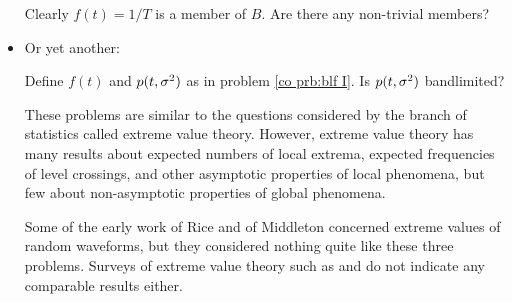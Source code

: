 \begin{itemize}
\begin{problem}
Clearly $f(t)=1/T$ is a member of $B$.  Are there any non-trivial
members?
\end{problem}

\item Or yet another:

\begin{problem}
\label{co prb:blf III}\mbox{}\par

Define $f(t)$ and $p(t,{\sigma^2})$ as in problem \ref{co prb:blf I}.  Is
$p(t,{\sigma^2})$ bandlimited?
\end{problem}

These problems are similar to the questions considered by the branch of
statistics called extreme value theory.  However, extreme value theory has
many results about expected numbers of local extrema, expected frequencies
of level crossings, and other asymptotic properties of local phenomena, but
few about non-asymptotic properties of global phenomena.

Some of the early work of Rice \cite{Ric39,Ric44,Ric45,Ric48} and of
Middleton \cite{Mid48} concerned extreme values of random waveforms, but
they considered nothing quite like these three problems.  Surveys of extreme
value theory such as \cite{Bla73} and \cite{Wei73} do not indicate any
comparable results either.  
\end{itemize}


